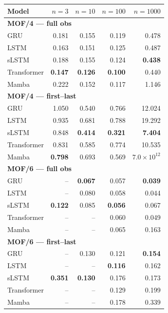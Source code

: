 \begin{tabular*}{\linewidth}{@{\extracolsep{\fill}}lrrrr}
\toprule
Model & $n=3$ & $n=10$ & $n=100$ & $n=1000$ \\
\midrule
\multicolumn{5}{l}{\textbf{MOF/4 — full obs}} \\
GRU & 0.181 & 0.155 & 0.119 & 0.478 \\
LSTM & 0.163 & 0.151 & 0.125 & 0.487 \\
sLSTM & 0.188 & 0.155 & 0.124 & \textbf{0.438} \\
Transformer & \textbf{0.147} & \textbf{0.126} & \textbf{0.100} & 0.440 \\
Mamba & 0.222 & 0.152 & 0.117 & 1.146 \\
\midrule
\multicolumn{5}{l}{\textbf{MOF/4 — first--last}} \\
GRU & 1.050 & 0.540 & 0.766 & 12.024 \\
LSTM & 0.935 & 0.681 & 0.788 & 19.292 \\
sLSTM & 0.848 & \textbf{0.414} & \textbf{0.321} & \textbf{7.404} \\
Transformer & 0.831 & 0.585 & 0.774 & 10.535 \\
Mamba & \textbf{0.798} & 0.693 & 0.569 & $7.0\!\times\!10^{12}$ \\
\midrule
\multicolumn{5}{l}{\textbf{MOF/6 — full obs}} \\
GRU & -- & \textbf{0.067} & 0.057 & \textbf{0.039} \\
LSTM & -- & 0.080 & 0.058 & 0.044 \\
sLSTM & \textbf{0.122} & 0.085 & \textbf{0.056} & 0.067 \\
Transformer & -- & -- & 0.060 & 0.049 \\
Mamba & -- & -- & 0.065 & 0.163 \\
\midrule
\multicolumn{5}{l}{\textbf{MOF/6 — first--last}} \\
GRU & -- & 0.130 & 0.121 & \textbf{0.154} \\
LSTM & -- & -- & \textbf{0.116} & 0.162 \\
sLSTM & \textbf{0.351} & \textbf{0.130} & 0.176 & 0.173 \\
Transformer & -- & -- & 0.129 & 0.199 \\
Mamba & -- & -- & 0.178 & 0.339 \\
\bottomrule
\end{tabular*}
